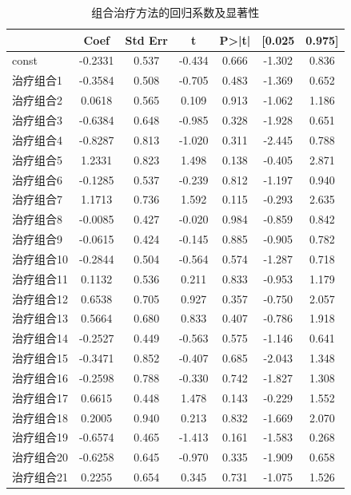 \documentclass[bwprint]{gmcmthesis}
\begin{document}
\begin{table}[ht]
\caption{组合治疗方法的回归系数及显著性}
\label{组合治疗方法的回归系数及显著性}
\centering
\begin{tabular}{lcccccc}
\toprule
& Coef & Std Err & t & P>|t| & [0.025 & 0.975] \\
\midrule
const & -0.2331 & 0.537 & -0.434 & 0.666 & -1.302 & 0.836 \\
治疗组合1 & -0.3584 & 0.508 & -0.705 & 0.483 & -1.369 & 0.652 \\
治疗组合2 & 0.0618 & 0.565 & 0.109 & 0.913 & -1.062 & 1.186 \\
治疗组合3 & -0.6384 & 0.648 & -0.985 & 0.328 & -1.928 & 0.651 \\
治疗组合4 & -0.8287 & 0.813 & -1.020 & 0.311 & -2.445 & 0.788 \\
治疗组合5 & 1.2331 & 0.823 & 1.498 & 0.138 & -0.405 & 2.871 \\
治疗组合6 & -0.1285 & 0.537 & -0.239 & 0.812 & -1.197 & 0.940 \\
治疗组合7 & 1.1713 & 0.736 & 1.592 & 0.115 & -0.293 & 2.635 \\
治疗组合8 & -0.0085 & 0.427 & -0.020 & 0.984 & -0.859 & 0.842 \\
治疗组合9 & -0.0615 & 0.424 & -0.145 & 0.885 & -0.905 & 0.782 \\
治疗组合10 & -0.2844 & 0.504 & -0.564 & 0.574 & -1.287 & 0.718 \\
治疗组合11 & 0.1132 & 0.536 & 0.211 & 0.833 & -0.953 & 1.179 \\
治疗组合12 & 0.6538 & 0.705 & 0.927 & 0.357 & -0.750 & 2.057 \\
治疗组合13 & 0.5664 & 0.680 & 0.833 & 0.407 & -0.786 & 1.918 \\
治疗组合14 & -0.2527 & 0.449 & -0.563 & 0.575 & -1.146 & 0.641 \\
治疗组合15 & -0.3471 & 0.852 & -0.407 & 0.685 & -2.043 & 1.348 \\
治疗组合16 & -0.2598 & 0.788 & -0.330 & 0.742 & -1.827 & 1.308 \\
治疗组合17 & 0.6615 & 0.448 & 1.478 & 0.143 & -0.229 & 1.552 \\
治疗组合18 & 0.2005 & 0.940 & 0.213 & 0.832 & -1.669 & 2.070 \\
治疗组合19 & -0.6574 & 0.465 & -1.413 & 0.161 & -1.583 & 0.268 \\
治疗组合20 & -0.6258 & 0.645 & -0.970 & 0.335 & -1.909 & 0.658 \\
治疗组合21 & 0.2255 & 0.654 & 0.345 & 0.731 & -1.075 & 1.526 \\

\end{tabular}
\end{table}
\end{document}
